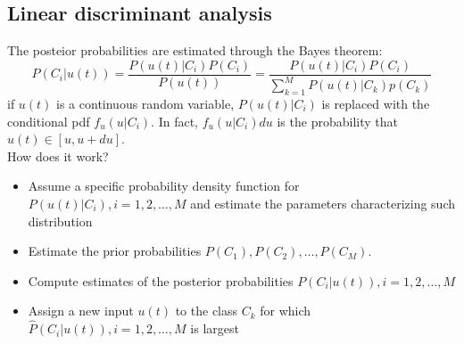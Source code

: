 \documentclass{book}
\begin{document}
\subsection{Linear discriminant analysis}
The posteior probabilities are estimated through the Bayes theorem:
\[
    P(C_i|u(t)) =\displaystyle\frac{P(u(t)|C_i)P(C_i)}{P(u(t))}=\displaystyle\frac{P(u(t)|C_i)P(C_i)}{\sum_{k=1}^{M}P(u(t)|C_k)p(C_k)}
\]
if $u(t)$ is a continuous random variable, $P(u(t)|C_i)$ is replaced with the conditional pdf $f_u(u|C_i)$. In fact, $f_u(u|C_i)du$ is the probability that $u(t)\in[u,u+du]$.
\\How does it work? 
\begin{itemize}
    \item Assume a specific probability density function for $P(u(t)|C_i),i=1,2,\dots,M$ and estimate the parameters characterizing such distribution 
    \item Estimate the prior probabilities $P(C_1),P(C_2),\dots,P(C_M)$. 
    \item Compute estimates of the posterior probabilities $P(C_i|u(t)),i=1,2,\dots,M$ 
    \item Assign a new input $u(t)$ to the class $C_k$ for which $\hat{P}(C_i|u(t)),i=1,2,\dots, M$ is largest
\end{itemize}
\end{document}
